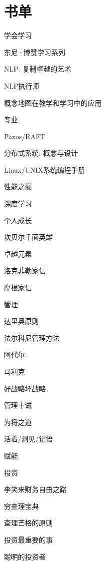 \section{书单}

学会学习
\begin{enumbox}
\item 东尼·博赞学习系列
\item NLP: 复制卓越的艺术
\item NLP执行师
\item 概念地图在教学和学习中的应用
\end{enumbox}

专业
\begin{enumbox}
\item Paxos/RAFT
\item 分布式系统: 概念与设计
\item Linux/UNIX系统编程手册
\item 性能之巅
\item 深度学习
\end{enumbox}

个人成长
\begin{enumbox}
\item 坎贝尔千面英雄
\item 卓越元素
\item 洛克菲勒家信
\item 摩根家信
\end{enumbox} 

管理
\begin{enumbox} 
\item 达里奥原则
\item 法尔科尼管理方法
\item 阿代尔
\item 马利克
\item 好战略坏战略
\item 管理十诫
\item 为将之道
\item 活着/洞见/觉悟
\item 赋能
\end{enumbox} 

投资
\begin{enumbox} 
\item 李笑来财务自由之路
\item 穷查理宝典
\item 查理芒格的原则
\item 投资最重要的事
\item 聪明的投资者
\end{enumbox} 

